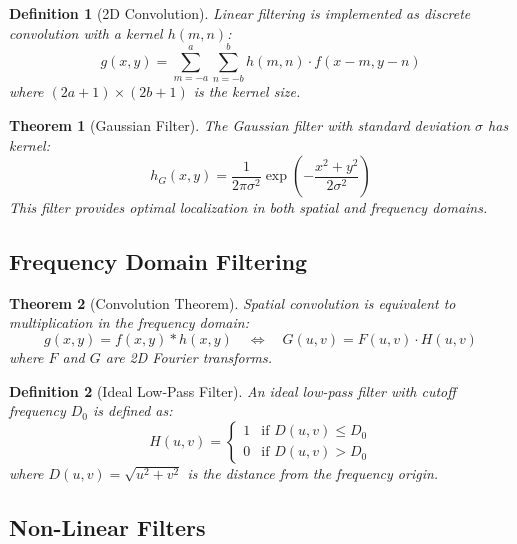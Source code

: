 \documentclass[a4paper, 11pt]{article}
\newtheorem{definition}{Definition}[section]
\newtheorem{theorem}{Theorem}[section]
\begin{document}
\begin{definition}[2D Convolution]
Linear filtering is implemented as discrete convolution with a kernel $h(m,n)$:
\begin{equation}
g(x,y) = \sum_{m=-a}^{a} \sum_{n=-b}^{b} h(m,n) \cdot f(x-m, y-n)
\end{equation}
where $(2a+1) \times (2b+1)$ is the kernel size.
\end{definition}

\begin{theorem}[Gaussian Filter]
The Gaussian filter with standard deviation $\sigma$ has kernel:
\begin{equation}
h_G(x,y) = \frac{1}{2\pi\sigma^2} \exp\left(-\frac{x^2 + y^2}{2\sigma^2}\right)
\end{equation}
This filter provides optimal localization in both spatial and frequency domains.
\end{theorem}

\subsection{Frequency Domain Filtering}

\begin{theorem}[Convolution Theorem]
Spatial convolution is equivalent to multiplication in the frequency domain:
\begin{equation}
g(x,y) = f(x,y) \ast h(x,y) \quad \Leftrightarrow \quad G(u,v) = F(u,v) \cdot H(u,v)
\end{equation}
where $F$ and $G$ are 2D Fourier transforms.
\end{theorem}

\begin{definition}[Ideal Low-Pass Filter]
An ideal low-pass filter with cutoff frequency $D_0$ is defined as:
\begin{equation}
H(u,v) = \begin{cases}
1 & \text{if } D(u,v) \leq D_0 \\
0 & \text{if } D(u,v) > D_0
\end{cases}
\end{equation}
where $D(u,v) = \sqrt{u^2 + v^2}$ is the distance from the frequency origin.
\end{definition}

\subsection{Non-Linear Filters}
\end{document}
